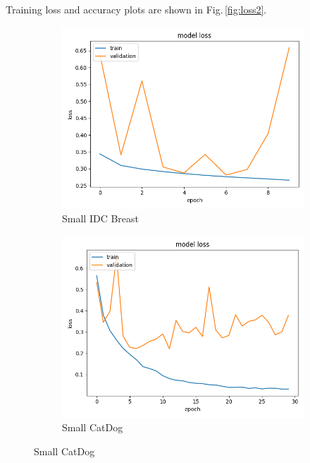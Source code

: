 Training loss and accuracy plots are shown in Fig.\,\ref{fig:loss2}. 

\begin{figure}[h]
\centering
\begin{subfigure}[b]{.45\linewidth}
\includegraphics[width=\linewidth]{Figs/small_breast_loss.jpg}
\caption{Small IDC Breast}
\end{subfigure}
\begin{subfigure}[b]{.45\linewidth}
\includegraphics[width=\linewidth]{Figs/small_catdog_loss.jpg}
\caption{Small CatDog}
\end{subfigure}


\end{figure}

